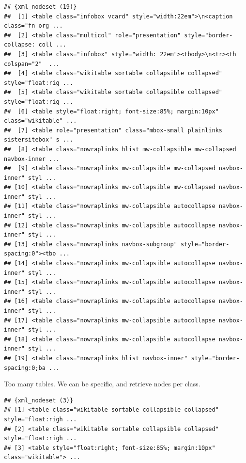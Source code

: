 \documentclass[
]{book}
\newenvironment{Shaded}{\begin{snugshade}}{\end{snugshade}}
\newcommand{\KeywordTok}[1]{\textcolor[rgb]{0.13,0.29,0.53}{\textbf{#1}}}
\newcommand{\NormalTok}[1]{#1}
\newcommand{\OperatorTok}[1]{\textcolor[rgb]{0.81,0.36,0.00}{\textbf{#1}}}
\newcommand{\StringTok}[1]{\textcolor[rgb]{0.31,0.60,0.02}{#1}}
\begin{document}
\begin{verbatim}
## {xml_nodeset (19)}
##  [1] <table class="infobox vcard" style="width:22em">\n<caption class="fn org ...
##  [2] <table class="multicol" role="presentation" style="border-collapse: coll ...
##  [3] <table class="infobox" style="width: 22em"><tbody>\n<tr><th colspan="2"  ...
##  [4] <table class="wikitable sortable collapsible collapsed" style="float:rig ...
##  [5] <table class="wikitable sortable collapsible collapsed" style="float:rig ...
##  [6] <table style="float:right; font-size:85%; margin:10px" class="wikitable" ...
##  [7] <table role="presentation" class="mbox-small plainlinks sistersitebox" s ...
##  [8] <table class="nowraplinks hlist mw-collapsible mw-collapsed navbox-inner ...
##  [9] <table class="nowraplinks mw-collapsible mw-collapsed navbox-inner" styl ...
## [10] <table class="nowraplinks mw-collapsible mw-collapsed navbox-inner" styl ...
## [11] <table class="nowraplinks mw-collapsible autocollapse navbox-inner" styl ...
## [12] <table class="nowraplinks mw-collapsible autocollapse navbox-inner" styl ...
## [13] <table class="nowraplinks navbox-subgroup" style="border-spacing:0"><tbo ...
## [14] <table class="nowraplinks mw-collapsible autocollapse navbox-inner" styl ...
## [15] <table class="nowraplinks mw-collapsible autocollapse navbox-inner" styl ...
## [16] <table class="nowraplinks mw-collapsible autocollapse navbox-inner" styl ...
## [17] <table class="nowraplinks mw-collapsible autocollapse navbox-inner" styl ...
## [18] <table class="nowraplinks mw-collapsible autocollapse navbox-inner" styl ...
## [19] <table class="nowraplinks hlist navbox-inner" style="border-spacing:0;ba ...
\end{verbatim}

Too many tables. We can be specific, and retrieve nodes per class.

\begin{Shaded}
\end{Shaded}

\begin{verbatim}
## {xml_nodeset (3)}
## [1] <table class="wikitable sortable collapsible collapsed" style="float:righ ...
## [2] <table class="wikitable sortable collapsible collapsed" style="float:righ ...
## [3] <table style="float:right; font-size:85%; margin:10px" class="wikitable"> ...
\end{verbatim}
\end{document}
